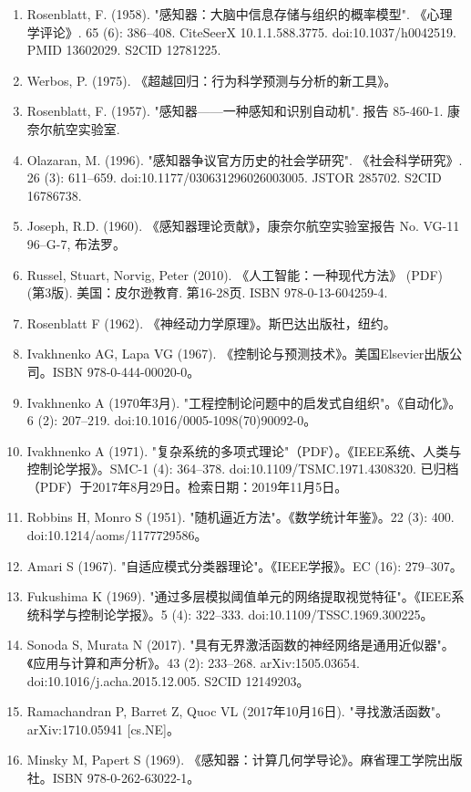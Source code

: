 \begin{enumerate}
\item Rosenblatt, F. (1958). "感知器：大脑中信息存储与组织的概率模型". 《心理学评论》. 65 (6): 386–408. CiteSeerX 10.1.1.588.3775. doi:10.1037/h0042519. PMID 13602029. S2CID 12781225.
\item Werbos, P. (1975). 《超越回归：行为科学预测与分析的新工具》。
\item Rosenblatt, F. (1957). "感知器——一种感知和识别自动机". 报告 85-460-1. 康奈尔航空实验室.
\item Olazaran, M. (1996). "感知器争议官方历史的社会学研究". 《社会科学研究》. 26 (3): 611–659. doi:10.1177/030631296026003005. JSTOR 285702. S2CID 16786738.
\item Joseph, R.D. (1960). 《感知器理论贡献》，康奈尔航空实验室报告 No. VG-11 96--G-7, 布法罗。
\item Russel, Stuart, Norvig, Peter (2010). 《人工智能：一种现代方法》 (PDF) (第3版). 美国：皮尔逊教育. 第16-28页. ISBN 978-0-13-604259-4.
\item Rosenblatt F (1962). 《神经动力学原理》。斯巴达出版社，纽约。
\item Ivakhnenko AG, Lapa VG (1967). 《控制论与预测技术》。美国Elsevier出版公司。ISBN 978-0-444-00020-0。
\item Ivakhnenko A (1970年3月). "工程控制论问题中的启发式自组织"。《自动化》。6 (2): 207–219. doi:10.1016/0005-1098(70)90092-0。
\item Ivakhnenko A (1971). "复杂系统的多项式理论"（PDF）。《IEEE系统、人类与控制论学报》。SMC-1 (4): 364–378. doi:10.1109/TSMC.1971.4308320. 已归档（PDF）于2017年8月29日。检索日期：2019年11月5日。
\item Robbins H, Monro S (1951). "随机逼近方法"。《数学统计年鉴》。22 (3): 400. doi:10.1214/aoms/1177729586。
\item Amari S (1967). "自适应模式分类器理论"。《IEEE学报》。EC (16): 279–307。
\item Fukushima K (1969). "通过多层模拟阈值单元的网络提取视觉特征"。《IEEE系统科学与控制论学报》。5 (4): 322–333. doi:10.1109/TSSC.1969.300225。
\item Sonoda S, Murata N (2017). "具有无界激活函数的神经网络是通用近似器"。《应用与计算和声分析》。43 (2): 233–268. arXiv:1505.03654. doi:10.1016/j.acha.2015.12.005. S2CID 12149203。
\item Ramachandran P, Barret Z, Quoc VL (2017年10月16日). "寻找激活函数"。arXiv:1710.05941 [cs.NE]。
\item Minsky M, Papert S (1969). 《感知器：计算几何学导论》。麻省理工学院出版社。ISBN 978-0-262-63022-1。

\end{enumerate}
